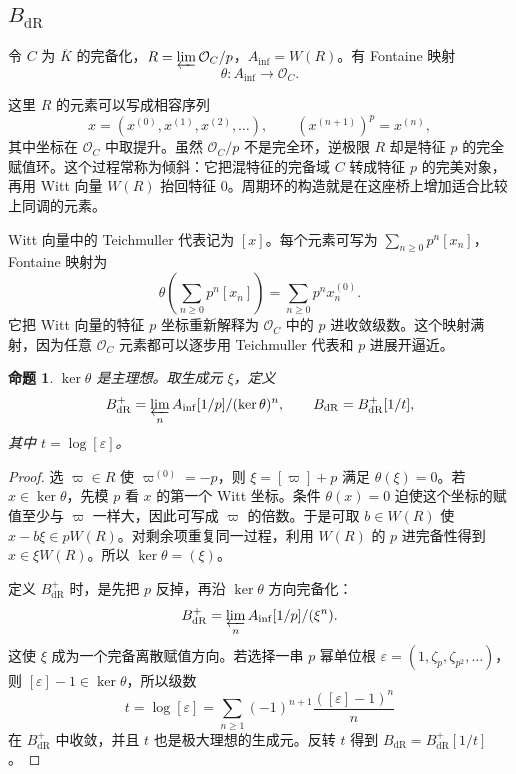 \documentclass[11pt,a4paper,openany]{ctexbook}
\numberwithin{equation}{chapter}
\theoremstyle{plain}
\newtheorem{proposition}[theorem]{命题}
\theoremstyle{definition}
\theoremstyle{remark}
\begin{document}
\subsection{\texorpdfstring{$B_{\mathrm{dR}}$}{BdR}}

令 $C$ 为 $\overline K$ 的完备化，$R=\varprojlim\mathcal O_C/p$，$A_{\inf}=W(R)$。有 Fontaine 映射
\[
  \theta:A_{\inf}\to\mathcal O_C.
\]

这里 $R$ 的元素可以写成相容序列
\[
  x=(x^{(0)},x^{(1)},x^{(2)},\ldots),\qquad (x^{(n+1)})^p=x^{(n)},
\]
其中坐标在 $\mathcal O_C$ 中取提升。虽然 $\mathcal O_C/p$ 不是完全环，逆极限 $R$ 却是特征 $p$ 的完全赋值环。这个过程常称为倾斜：它把混特征的完备域 $C$ 转成特征 $p$ 的完美对象，再用 Witt 向量 $W(R)$ 抬回特征 $0$。周期环的构造就是在这座桥上增加适合比较上同调的元素。

Witt 向量中的 Teichmuller 代表记为 $[x]$。每个元素可写为 $\sum_{n\ge0}p^n[x_n]$，Fontaine 映射为
\[
  \theta\left(\sum_{n\ge0}p^n[x_n]\right)=\sum_{n\ge0}p^n x_n^{(0)}.
\]
它把 Witt 向量的特征 $p$ 坐标重新解释为 $\mathcal O_C$ 中的 $p$ 进收敛级数。这个映射满射，因为任意 $\mathcal O_C$ 元素都可以逐步用 Teichmuller 代表和 $p$ 进展开逼近。

\begin{proposition}
$\ker\theta$ 是主理想。取生成元 $\xi$，定义
\[
  B_{\mathrm{dR}}^+=\varprojlim_n A_{\inf}[1/p]/(\ker\theta)^n,\qquad
  B_{\mathrm{dR}}=B_{\mathrm{dR}}^+[1/t],
\]
其中 $t=\log[\varepsilon]$。
\end{proposition}

\begin{proof}
选 $\varpi\in R$ 使 $\varpi^{(0)}=-p$，则 $\xi=[\varpi]+p$ 满足 $\theta(\xi)=0$。若 $x\in\ker\theta$，先模 $p$ 看 $x$ 的第一个 Witt 坐标。条件 $\theta(x)=0$ 迫使这个坐标的赋值至少与 $\varpi$ 一样大，因此可写成 $\varpi$ 的倍数。于是可取 $b\in W(R)$ 使 $x-b\xi\in pW(R)$。对剩余项重复同一过程，利用 $W(R)$ 的 $p$ 进完备性得到 $x\in\xi W(R)$。所以 $\ker\theta=(\xi)$。

定义 $B_{\mathrm{dR}}^+$ 时，是先把 $p$ 反掉，再沿 $\ker\theta$ 方向完备化：
\[
  B_{\mathrm{dR}}^+=\varprojlim_n A_{\inf}[1/p]/(\xi^n).
\]
这使 $\xi$ 成为一个完备离散赋值方向。若选择一串 $p$ 幂单位根 $\varepsilon=(1,\zeta_p,\zeta_{p^2},\ldots)$，则 $[\varepsilon]-1\in\ker\theta$，所以级数
\[
  t=\log[\varepsilon]=\sum_{n\ge1}(-1)^{n+1}\frac{([\varepsilon]-1)^n}{n}
\]
在 $B_{\mathrm{dR}}^+$ 中收敛，并且 $t$ 也是极大理想的生成元。反转 $t$ 得到 $B_{\mathrm{dR}}=B_{\mathrm{dR}}^+[1/t]$。
\end{proof}
\end{document}
